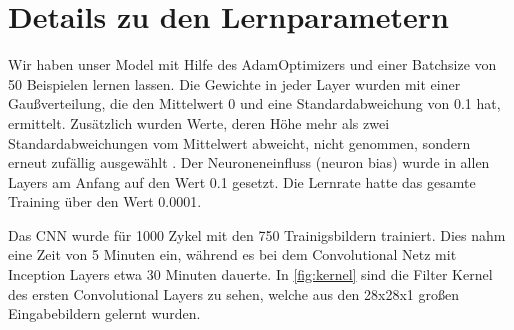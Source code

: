 \documentclass[runningheads,a4paper]{llncs}[2015/06/24]
\begin{document}
\section{Details zu den Lernparametern}
Wir haben unser Model mit Hilfe des AdamOptimizers und einer Batchsize von 50 Beispielen lernen lassen. Die Gewichte in jeder Layer wurden mit einer Gaußverteilung, die den Mittelwert 0 und eine Standardabweichung von 0.1 hat, ermittelt. Zusätzlich wurden Werte, deren Höhe mehr als zwei Standardabweichungen vom Mittelwert abweicht, nicht genommen, sondern erneut zufällig ausgewählt \cite{tensorflow}. Der Neuroneneinfluss (neuron bias) wurde in allen Layers am Anfang auf den Wert 0.1 gesetzt. Die Lernrate hatte das gesamte Training über den Wert 0.0001. 

Das CNN wurde für 1000 Zykel mit den 750 Trainigsbildern trainiert. Dies nahm eine Zeit von 5 Minuten ein, während es bei dem Convolutional Netz mit Inception Layers etwa 30 Minuten dauerte. In \cref{fig:kernel} sind die Filter Kernel des ersten Convolutional Layers zu sehen, welche aus den 28x28x1 großen Eingabebildern gelernt wurden.
\end{document}
